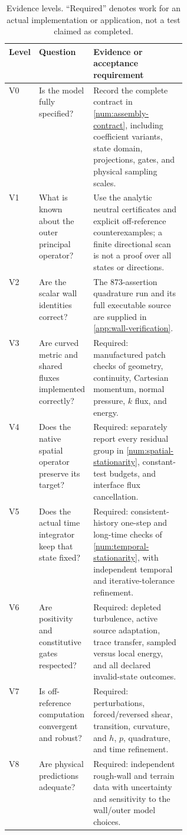 \documentclass[11pt,a4paper]{article}
\numberwithin{equation}{section}
\begin{document}
\begin{table}[htbp]
\centering\small
\caption{Evidence levels.  ``Required'' denotes work for an actual
implementation or application, not a test claimed as completed.}
\begin{tabularx}{\linewidth}{@{}p{0.07\linewidth}p{0.28\linewidth}X@{}}
\toprule
Level & Question & Evidence or acceptance requirement\\
\midrule
V0 & Is the model fully specified? & Record the complete contract in
\cref{num:assembly-contract}, including coefficient variants,
state domain, projections, gates, and physical sampling scales.\\
V1 & What is known about the outer principal operator? & Use the
analytic neutral certificates and explicit off-reference
counterexamples; a finite directional scan is not a proof over
all states or directions.\\
V2 & Are the scalar wall identities correct? & The 873-assertion
quadrature run and its full executable source are supplied in
\cref{app:wall-verification}.\\
V3 & Are curved metric and shared fluxes implemented correctly? &
Required: manufactured patch checks of geometry, continuity,
Cartesian momentum, normal pressure, $k$ flux, and energy.\\
V4 & Does the native spatial operator preserve its target? &
Required: separately report every residual group in
\cref{num:spatial-stationarity}, constant-test budgets, and
interface flux cancellation.\\
V5 & Does the actual time integrator keep that state fixed? &
Required: consistent-history one-step and long-time checks of
\cref{num:temporal-stationarity}, with independent temporal and
iterative-tolerance refinement.\\
V6 & Are positivity and constitutive gates respected? &
Required: depleted turbulence, active source adaptation,
trace transfer, sampled versus local energy, and all declared
invalid-state outcomes.\\
V7 & Is off-reference computation convergent and robust? &
Required: perturbations, forced/reversed shear, transition,
curvature, and $h$, $p$, quadrature, and time refinement.\\
V8 & Are physical predictions adequate? & Required:
independent rough-wall and terrain data with uncertainty and
sensitivity to the wall/outer model choices.\\
\bottomrule
\end{tabularx}
\end{table}
\end{document}
